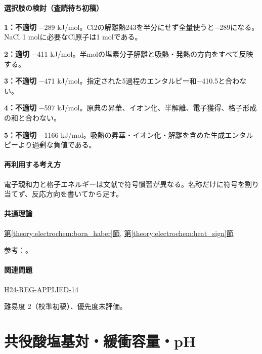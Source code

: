 \paragraph{選択肢の検討（査読待ち初稿）}\mbox{}\par

\noindent\textbf{1：不適切} −289 kJ/mol。Cl2の解離熱243を半分にせず全量使うと−289になる。NaCl 1 molに必要なCl原子は1 molである。\par

\noindent\textbf{2：適切} −411 kJ/mol。半molの塩素分子解離と吸熱・発熱の方向をすべて反映する。\par

\noindent\textbf{3：不適切} −471 kJ/mol。指定された5過程のエンタルピー和−410.5と合わない。\par

\noindent\textbf{4：不適切} −597 kJ/mol。原典の昇華、イオン化、半解離、電子獲得、格子形成の和と合わない。\par

\noindent\textbf{5：不適切} −1166 kJ/mol。吸熱の昇華・イオン化・解離を含めた生成エンタルピーより過剰な負値である。\par

\paragraph{再利用する考え方} 電子親和力と格子エネルギーは文献で符号慣習が異なる。名称だけに符号を割り当てず、反応方向を書いてから足す。

\paragraph{共通理論} \hyperref[theory:electrochem:born_haber]{第\ref*{theory:electrochem:born_haber}節}, \hyperref[theory:electrochem:heat_sign]{第\ref*{theory:electrochem:heat_sign}節}

\par 参考：\cite{openstax_born_haber}。

\paragraph{関連問題} \hyperref[q:h24-reg-applied-14]{H24-REG-APPLIED-14}

\par 難易度 2（校準初稿）、優先度未評価。

\section{共役酸塩基対・緩衝容量・pH}

